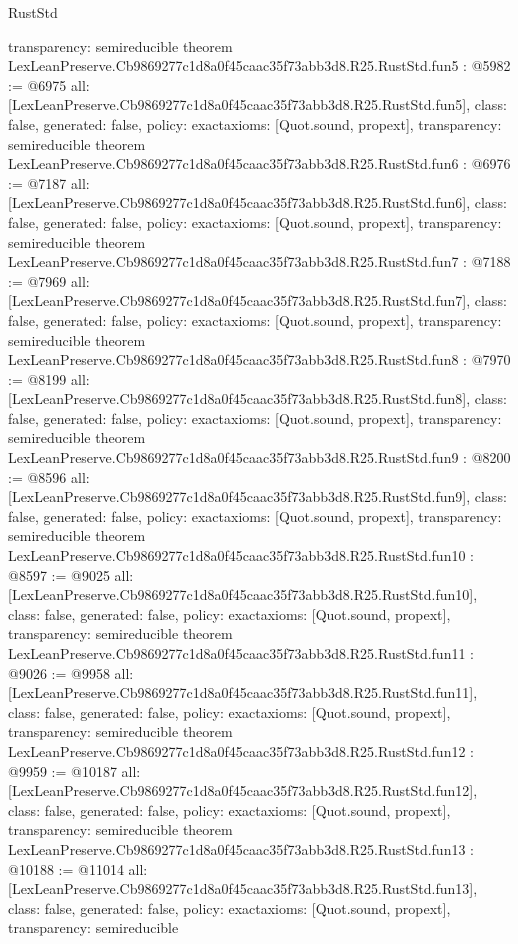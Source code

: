 \begin{lexlean}{RustStd}
\begin{coremodule}
{  transparency: semireducible
}
theorem LexLeanPreserve.Cb9869277c1d8a0f45caac35f73abb3d8.R25.RustStd.fun5 : @5982 := @6975 {
  all: [LexLeanPreserve.Cb9869277c1d8a0f45caac35f73abb3d8.R25.RustStd.fun5],
  class: false,
  generated: false,
  policy: exact{axioms: [Quot.sound, propext]},
  transparency: semireducible
}
theorem LexLeanPreserve.Cb9869277c1d8a0f45caac35f73abb3d8.R25.RustStd.fun6 : @6976 := @7187 {
  all: [LexLeanPreserve.Cb9869277c1d8a0f45caac35f73abb3d8.R25.RustStd.fun6],
  class: false,
  generated: false,
  policy: exact{axioms: [Quot.sound, propext]},
  transparency: semireducible
}
theorem LexLeanPreserve.Cb9869277c1d8a0f45caac35f73abb3d8.R25.RustStd.fun7 : @7188 := @7969 {
  all: [LexLeanPreserve.Cb9869277c1d8a0f45caac35f73abb3d8.R25.RustStd.fun7],
  class: false,
  generated: false,
  policy: exact{axioms: [Quot.sound, propext]},
  transparency: semireducible
}
theorem LexLeanPreserve.Cb9869277c1d8a0f45caac35f73abb3d8.R25.RustStd.fun8 : @7970 := @8199 {
  all: [LexLeanPreserve.Cb9869277c1d8a0f45caac35f73abb3d8.R25.RustStd.fun8],
  class: false,
  generated: false,
  policy: exact{axioms: [Quot.sound, propext]},
  transparency: semireducible
}
theorem LexLeanPreserve.Cb9869277c1d8a0f45caac35f73abb3d8.R25.RustStd.fun9 : @8200 := @8596 {
  all: [LexLeanPreserve.Cb9869277c1d8a0f45caac35f73abb3d8.R25.RustStd.fun9],
  class: false,
  generated: false,
  policy: exact{axioms: [Quot.sound, propext]},
  transparency: semireducible
}
theorem LexLeanPreserve.Cb9869277c1d8a0f45caac35f73abb3d8.R25.RustStd.fun10 : @8597 := @9025 {
  all: [LexLeanPreserve.Cb9869277c1d8a0f45caac35f73abb3d8.R25.RustStd.fun10],
  class: false,
  generated: false,
  policy: exact{axioms: [Quot.sound, propext]},
  transparency: semireducible
}
theorem LexLeanPreserve.Cb9869277c1d8a0f45caac35f73abb3d8.R25.RustStd.fun11 : @9026 := @9958 {
  all: [LexLeanPreserve.Cb9869277c1d8a0f45caac35f73abb3d8.R25.RustStd.fun11],
  class: false,
  generated: false,
  policy: exact{axioms: [Quot.sound, propext]},
  transparency: semireducible
}
theorem LexLeanPreserve.Cb9869277c1d8a0f45caac35f73abb3d8.R25.RustStd.fun12 : @9959 := @10187 {
  all: [LexLeanPreserve.Cb9869277c1d8a0f45caac35f73abb3d8.R25.RustStd.fun12],
  class: false,
  generated: false,
  policy: exact{axioms: [Quot.sound, propext]},
  transparency: semireducible
}
theorem LexLeanPreserve.Cb9869277c1d8a0f45caac35f73abb3d8.R25.RustStd.fun13 : @10188 := @11014 {
  all: [LexLeanPreserve.Cb9869277c1d8a0f45caac35f73abb3d8.R25.RustStd.fun13],
  class: false,
  generated: false,
  policy: exact{axioms: [Quot.sound, propext]},
  transparency: semireducible
}
\end{coremodule}
\end{lexlean}
